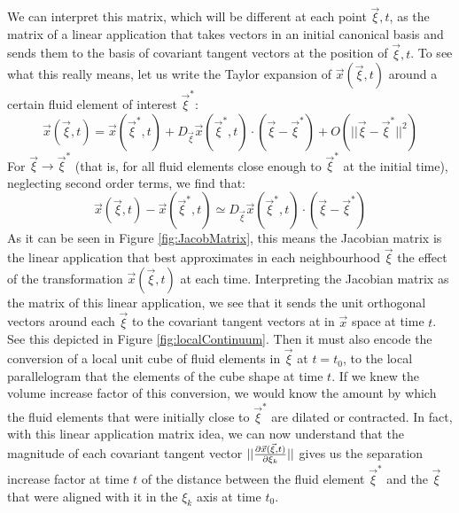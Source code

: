 \documentclass[11pt, a4paper]{article} %
\begin{document}
We can interpret this matrix, which will be different at each point $\vec{\xi},t$, as the matrix of a linear application that takes vectors in an initial canonical basis and sends them to the basis of covariant tangent vectors at the position of $\vec{\xi},t$. To see what this really means, let us write the Taylor expansion of $\vec{x}(\vec{\xi},t)$ around a certain fluid element of interest $\vec{\xi}^*$:
\begin{equation}
\vec{x}(\vec{\xi},t)=\vec{x}(\vec{\xi}^*,t)+D_{\vec{\xi}}\vec{x}(\vec{\xi}^*,t)\cdot (\vec{\xi}-\vec{\xi}^*)+O(||\vec{\xi}-\vec{\xi}^*||^2)
\end{equation}
For $\vec{\xi}\rightarrow \vec{\xi}^*$ (that is, for all fluid elements close enough to $\vec{\xi}^*$ at the initial time), neglecting second order terms, we find that:
\begin{equation}
\vec{x}(\vec{\xi},t)-\vec{x}(\vec{\xi}^*,t)\simeq D_{\vec{\xi}}\vec{x}(\vec{\xi}^*,t)\cdot (\vec{\xi}-\vec{\xi}^*)
\end{equation}
As it can be seen in Figure \ref{fig:JacobMatrix}, this means the Jacobian matrix is the linear application that best approximates in each neighbourhood $\vec{\xi}$ the effect of the transformation $\vec{x}(\vec{\xi},t)$ at each time. Interpreting the Jacobian matrix as the matrix of this linear application, we see that it sends the unit orthogonal vectors around each $\vec{\xi}$ to the covariant tangent vectors at in $\vec{x}$ space at time $t$. See this depicted in Figure \ref{fig:localContinuum}. Then it must also encode the conversion of a local unit cube of fluid elements in $\vec{\xi}$ at $t=t_0$, to the local parallelogram that the elements of the cube shape at time $t$. If we knew the volume increase factor of this conversion, we would know the amount by which the fluid elements that were initially close to $\vec{\xi}^*$ are dilated or contracted. In fact, with this linear application matrix idea, we can now understand that the magnitude of each covariant tangent vector $||\pdv{\vec{x}(\vec{\xi},t)}{\xi_k}||$ gives us the separation increase factor at time $t$ of the distance between the fluid element $\vec{\xi}^*$ and the $\vec{\xi}$ that were aligned with it in the $\xi_k$ axis at time $t_0$.
\end{document}
